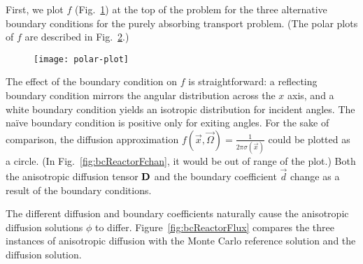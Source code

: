 First, we plot $f$ (Fig.~\ref{fig:bcReactorF}) at the top of the problem for
the three alternative boundary conditions for the purely absorbing transport
problem. (The polar plots of $f$ are described in Fig.~\ref{fig:polarPlot}.)
%
\begin{figure}[tb]
  \centering
  \subfloat[$f(2.5,10,\omega)$]{%
    \hspace{-.25in}%
   \label{fig:bcReactorFchan}%
  }%
  \subfloat[$f(1.5,10,\omega)$]{%
    \hspace{-.25in}%
    
  }%
  \label{fig:bcReactorF}
\end{figure}
%
\begin{figure}[htb]
  \centering
  \texttt{[image: polar-plot]}
  \label{fig:polarPlot}
\end{figure}
%
The effect of the boundary condition on $f$ is straightforward: a reflecting boundary
condition mirrors the angular distribution across the $x$ axis, and a white
boundary condition yields an isotropic distribution for incident angles. The
na\"ive boundary condition is positive only for exiting angles. For the sake of
comparison, the diffusion approximation $f(\vec{x},\vec{\Omega}) =
\frac{1}{2\pi \sigma(\vec{x})}$ could be plotted as a circle. (In
Fig.~\ref{fig:bcReactorFchan}, it would be out of range of the plot.) Both the
anisotropic diffusion tensor $\mathbf{D}$ and the boundary coefficient
$\vec{d}$ change as a result of the boundary conditions.


\thesisclearpage

The different diffusion and boundary coefficients naturally cause the
anisotropic diffusion solutions $\phi$ to differ. Figure~\ref{fig:bcReactorFlux}
compares the three instances of anisotropic diffusion with the Monte Carlo
reference solution and the diffusion solution.

